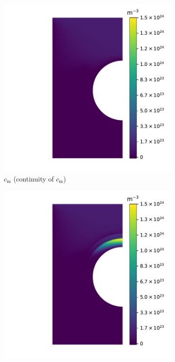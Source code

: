 \begin{figure}
    \centering
    \begin{subfigure}{0.5\linewidth}
        \centering
        \includegraphics[width=\linewidth]{Figures/Chapter3/monoblocks/interface_condition/iter case/solute_c.pdf}
        \caption{$c_\mathrm{m}$ (continuity of $c_\mathrm{m}$)}
    \end{subfigure}%
    \begin{subfigure}{0.5\linewidth}
        \centering
        \includegraphics[width=\linewidth]{Figures/Chapter3/monoblocks/interface_condition/iter case/solute_mu.pdf}

\end{subfigure}
\end{figure}
